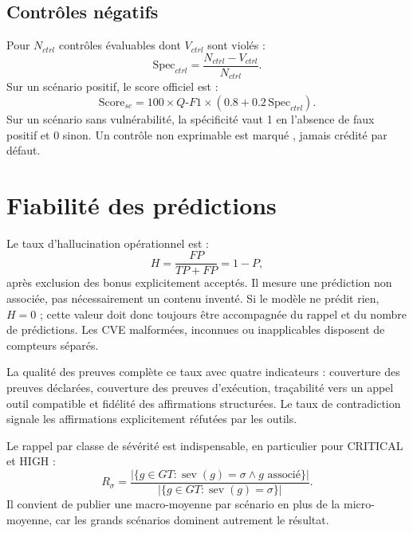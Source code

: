 \documentclass[11pt,a4paper]{article}
\newcommand{\metric}[1]{\texttt{\detokenize{#1}}}
\begin{document}
\subsection{Contrôles négatifs}

Pour $N_{ctrl}$ contrôles évaluables dont $V_{ctrl}$ sont violés :
\begin{equation}
  \mathrm{Spec}_{ctrl}=\frac{N_{ctrl}-V_{ctrl}}{N_{ctrl}}.
\end{equation}
Sur un scénario positif, le score officiel est :
\begin{equation}
  \mathrm{Score}_{sc}=100\times Q\text{-}F1\times
  \left(0.8+0.2\,\mathrm{Spec}_{ctrl}\right).
\end{equation}
Sur un scénario sans vulnérabilité, la spécificité vaut 1 en l'absence de faux
positif et 0 sinon. Un contrôle non exprimable est marqué \metric{unevaluable},
jamais crédité par défaut.

\section{Fiabilité des prédictions}

Le taux d'hallucination opérationnel est :
\begin{equation}
  H=\frac{FP}{TP+FP}=1-P,
\end{equation}
après exclusion des bonus explicitement acceptés. Il mesure une prédiction non
associée, pas nécessairement un contenu inventé. Si le modèle ne prédit rien,
$H=0$ ; cette valeur doit donc toujours être accompagnée du rappel et du nombre
de prédictions. Les CVE malformées, inconnues ou inapplicables disposent de
compteurs séparés.

La qualité des preuves complète ce taux avec quatre indicateurs : couverture
des preuves déclarées, couverture des preuves d'exécution, traçabilité vers un
appel outil compatible et fidélité des affirmations structurées. Le taux de
contradiction signale les affirmations explicitement réfutées par les outils.

Le rappel par classe de sévérité est indispensable, en particulier pour
CRITICAL et HIGH :
\begin{equation}
  R_{\sigma}=
  \frac{|\{g\in GT:\operatorname{sev}(g)=\sigma\land g\text{ associé}\}|}
       {|\{g\in GT:\operatorname{sev}(g)=\sigma\}|}.
\end{equation}
Il convient de publier une macro-moyenne par scénario en plus de la
micro-moyenne, car les grands scénarios dominent autrement le résultat.
\end{document}
